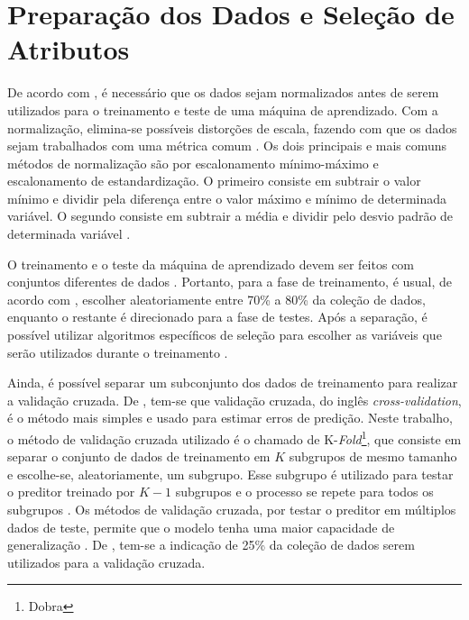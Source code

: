 \documentclass[12pt,oneside,a4paper,chapter=TITLE,section=TITLE,sumario=tradicional,english,brazil]{abntex2}
\begin{document}
\section{Preparação dos Dados e Seleção de Atributos}
De acordo com \textcite{haykin2009}, é necessário que os dados sejam normalizados antes de serem utilizados para o treinamento e teste de uma máquina de aprendizado. Com a normalização, elimina-se possíveis distorções de escala, fazendo com que os dados sejam trabalhados com uma métrica comum \cite{haykin2009}. Os dois principais e mais comuns métodos de normalização são por escalonamento mínimo-máximo e escalonamento de estandardização. O primeiro consiste em subtrair o valor mínimo e dividir pela diferença entre o valor máximo e mínimo de determinada variável. O segundo consiste em subtrair a média e dividir pelo desvio padrão de determinada variável \cite{haykin2009}.\par 
O treinamento e o teste da máquina de aprendizado devem ser feitos com conjuntos diferentes de dados \cite{haykin2009}. Portanto, para a fase de treinamento, é usual, de acordo com \textcite{guyon2003}, escolher aleatoriamente entre 70\% a 80\% da coleção de dados, enquanto o restante é direcionado para a fase de testes. Após a separação, é possível utilizar algoritmos específicos de seleção para escolher as variáveis que serão utilizados durante o treinamento \cite{haykin2009}.\par 
Ainda, é possível separar um subconjunto dos dados de treinamento para realizar a validação cruzada. De \cite{hastie2009}, tem-se que validação cruzada, do inglês \textit{cross-validation}, é o método mais simples e usado para estimar erros de predição. Neste trabalho, o método de validação cruzada utilizado é o chamado de K-\textit{Fold}\footnote{Dobra}, que consiste em separar o conjunto de dados de treinamento em $K$ subgrupos de mesmo tamanho e escolhe-se, aleatoriamente, um subgrupo. Esse subgrupo é utilizado para testar o preditor treinado por $K-1$ subgrupos e o processo se repete para todos os subgrupos \cites{kohavi2001}{hastie2009}. Os métodos de validação cruzada, por testar o preditor em múltiplos dados de teste, permite que o modelo tenha uma maior capacidade de generalização \cite{bishop2006}. De \textcite{haykin2009}, tem-se a indicação de 25\% da coleção de dados serem utilizados para a validação cruzada.\par 
\end{document}
